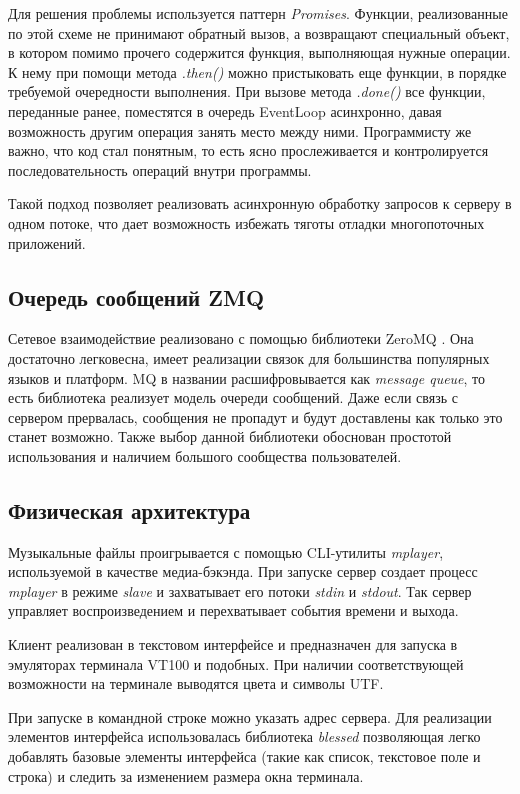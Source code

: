 Для решения проблемы используется паттерн \textit{Promises}. Функции,
реализованные по этой схеме не принимают обратный вызов, а возвращают
специальный объект, в котором помимо прочего содержится функция,
выполняющая нужные операции. К нему при помощи метода \textit{.then()}
можно пристыковать еще функции, в порядке требуемой очередности
выполнения. При вызове метода \textit{.done()} все функции, переданные
ранее, поместятся в очередь EventLoop асинхронно, давая возможность
другим операция занять место между ними. Программисту же важно, что
код стал понятным, то есть ясно прослеживается и контролируется
последовательность операций внутри программы.

Такой подход позволяет реализовать асинхронную обработку запросов к
серверу в одном потоке, что дает возможность избежать тяготы отладки
многопоточных приложений.

\subsection{ Очередь сообщений ZMQ }

Сетевое взаимодействие реализовано с помощью библиотеки ZeroMQ \cite{wiki:zmq}. Она
достаточно легковесна, имеет реализации связок для большинства
популярных языков и
платформ. MQ в названии расшифровывается как \textit{message queue},
то есть библиотека реализует модель очереди сообщений.
Даже если связь с сервером прервалась,
сообщения не пропадут и будут доставлены как только это станет
возможно. Также выбор данной библиотеки обоснован простотой
использования и наличием большого сообщества пользователей.

\subsection{ Физическая архитектура }

Музыкальные файлы проигрывается с помощью CLI-утилиты
\textit{mplayer}, используемой в качестве медиа-бэкэнда. При запуске
сервер создает процесс \textit{mplayer} в режиме \textit{slave} и
захватывает его потоки \textit{stdin} и \textit{stdout}. Так сервер
управляет воспроизведением и перехватывает события времени и выхода.

Клиент реализован в текстовом интерфейсе и предназначен для запуска в
эмуляторах терминала VT100 и подобных. При наличии соответствующей возможности на
терминале выводятся цвета и символы UTF.

При запуске в командной строке можно указать адрес сервера. Для
реализации элементов интерфейса использовалась библиотека \textit{blessed}
позволяющая легко добавлять базовые элементы интерфейса (такие как
список, текстовое поле и строка) и следить за изменением размера окна
терминала.

